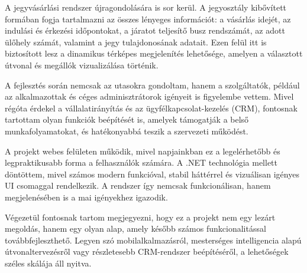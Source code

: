 A jegyvásárlási rendszer újragondolására is sor kerül. A jegyosztály kibővített formában fogja tartalmazni az összes lényeges információt: a vásárlás idejét, az indulási és érkezési időpontokat, a járatot teljesítő busz rendszámát, az adott ülőhely számát, valamint a jegy tulajdonosának adatait. Ezen felül itt is biztosított lesz a dinamikus térképes megjelenítés lehetősége, amelyen a választott útvonal és megállók vizualizálása történik.

A fejlesztés során nemcsak az utasokra gondoltam, hanem a szolgáltatók, például az alkalmazottak és céges adminisztrátorok igényeit is figyelembe vettem. Mivel régóta érdekel a vállalatirányítás és az ügyfélkapcsolat-kezelés (CRM), fontosnak tartottam olyan funkciók beépítését is, amelyek támogatják a belső munkafolyamatokat, és hatékonyabbá teszik a szervezeti működést.

A projekt webes felületen működik, mivel napjainkban ez a legelérhetőbb és legpraktikusabb forma a felhasználók számára. A .NET technológia mellett döntöttem, mivel számos modern funkcióval, stabil háttérrel és vizuálisan igényes UI csomaggal rendelkezik. A rendszer így nemcsak funkcionálisan, hanem megjelenésében is a mai igényekhez igazodik.

Végezetül fontosnak tartom megjegyezni, hogy ez a projekt nem egy lezárt megoldás, hanem egy olyan alap, amely később számos funkcionalitással továbbfejleszthető. Legyen szó mobilalkalmazásról, mesterséges intelligencia alapú útvonaltervezésről vagy részletesebb CRM-rendszer beépítéséről, a lehetőségek széles skálája áll nyitva.


